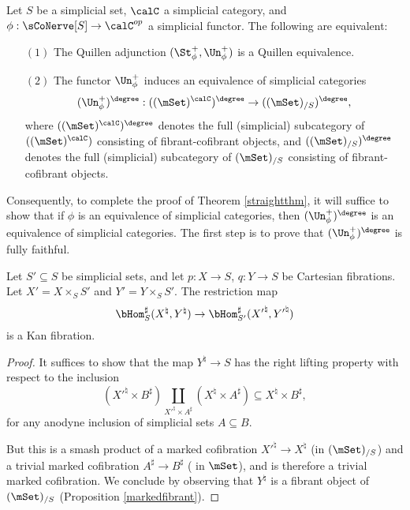 \begin{lemma}\label{gottaprove0}
Let $S$ be a simplicial set, $\calC$ a simplicial category, and $\phi: \sCoNerve[S] \rightarrow \calC^{op}$ a simplicial functor. The following are equivalent:
\begin{itemize}
\item[$(1)$] The Quillen adjunction $( \St^{+}_{\phi}, \Un^{+}_{\phi} )$ is a Quillen equivalence.

\item[$(2)$] The functor $\Un^{+}_{\phi}$ induces an equivalence of simplicial categories
$$ (\Un^{+}_{\phi})^{\degree} : ((\mSet)^{\calC})^{\degree} \rightarrow ((\mSet)_{/S})^{\degree},$$
where $((\mSet)^{\calC})^{\degree}$ denotes the full (simplicial) subcategory of
$( ( \mSet)^{\calC})$ consisting of fibrant-cofibrant objects, and $((\mSet)_{/S})^{\degree}$ denotes the full (simplicial) subcategory of $(\mSet)_{/S}$ consisting of fibrant-cofibrant objects.
\end{itemize}
\end{lemma}

Consequently, to complete the proof of Theorem \ref{straightthm}, it will suffice to show that
if $\phi$ is an equivalence of simplicial categories, then $(\Un^{+}_{\phi})^{\degree}$ is an equivalence of simplicial categories. The first step is to prove that $(\Un^{+}_{\phi})^{\degree}$ is fully faithful.

\begin{lemma}\label{gottaprove2}
Let $S' \subseteq S$ be simplicial sets, and let
$p: X \rightarrow S$, $q: Y \rightarrow S$ be Cartesian fibrations.
Let $X' = X \times_{S} S'$ and $Y' = Y \times_{S} S'$. The restriction map
$$ \bHom_{S}^{\sharp}(X^{\natural}, Y^{\natural}) \rightarrow \bHom_{S'}^{\sharp}( {X'}^{\natural}, {Y'}^{\natural})$$ is a Kan fibration.
\end{lemma}

\begin{proof}
It suffices to show that the map $Y^{\natural} \rightarrow S$ has the right lifting property with
respect to the inclusion
$$ ( {X'}^{\natural} \times B^{\sharp} ) \coprod_{ {X'}^{\natural} \times A^{\sharp} } (X^{\natural} \times A^{\sharp}) \subseteq X^{\natural} \times B^{\sharp},$$
for any anodyne inclusion of simplicial sets $A \subseteq B$.

But this is a smash product of a marked cofibration ${X'}^{\natural} \rightarrow X^{\natural}$ 
(in $(\mSet)_{/S}$) and a trivial marked cofibration $A^{\sharp} \rightarrow B^{\sharp}$
( in $\mSet$), and is therefore a trivial marked cofibration. We conclude by observing that $Y^{\natural}$ is a fibrant object of $(\mSet)_{/S}$ (Proposition \ref{markedfibrant}).
\end{proof}

